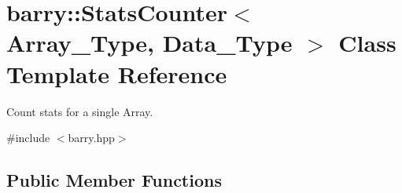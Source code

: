 \hypertarget{classbarry_1_1_stats_counter}{}\section{barry\+:\+:Stats\+Counter$<$ Array\+\_\+\+Type, Data\+\_\+\+Type $>$ Class Template Reference}
\label{classbarry_1_1_stats_counter}


Count stats for a single Array.  




{\ttfamily \#include $<$barry.\+hpp$>$}

\subsection*{Public Member Functions}
